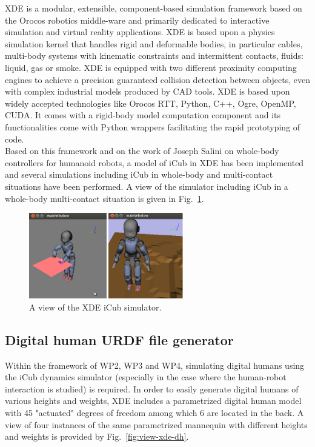 \documentclass[12pt,a4paper,twoside]{article}
\begin{document}
XDE is a modular, extensible, component-based simulation framework based on the Orocos \cite{bruyninckx-icra2003} robotics middle-ware and primarily dedicated to interactive simulation and virtual reality applications. XDE is based upon a physics simulation kernel that handles rigid and deformable bodies, in particular cables, multi-body systems with kinematic constraints and intermittent contacts, fluids: liquid, gas or smoke. XDE is equipped with two different proximity computing engines to achieve a precision guaranteed collision detection between objects, even with complex industrial models produced by CAD tools. XDE is based upon widely accepted technologies like Orocos RTT, Python, C++, Ogre, OpenMP, CUDA. It comes with a rigid-body model computation component and its functionalities come with Python wrappers facilitating the rapid prototyping of code.\\

Based on this framework and on the work of Joseph Salini \cite{salini2012} on whole-body controllers for humanoid robots, a model of iCub in XDE has been implemented and several simulations including iCub in whole-body and multi-contact situations have been performed. A view of the simulator including iCub in a whole-body multi-contact situation is given in Fig.~\ref{fig:XDE-view}.

\begin{figure}[h]
\begin{center}
\centering
\includegraphics[width=0.6\textwidth]{sim_xde2.png}
\caption{A view of the XDE iCub simulator.}
\label{fig:XDE-view}
\end{center}
\end{figure}


\subsection{Digital human URDF file generator}

Within the framework of WP2, WP3 and WP4, simulating digital humans using the iCub dynamics simulator (especially in the case where the human-robot interaction is studied) is required. In order to easily generate digital humans of various heights and weights, XDE includes a parametrized digital human model with 45 "actuated" degrees of freedom among which 6 are located in the back. A view of four instances of the same parametrized mannequin with different heights and weights is provided by Fig.~\ref{fig:view-xde-dh}.\\
\end{document}
